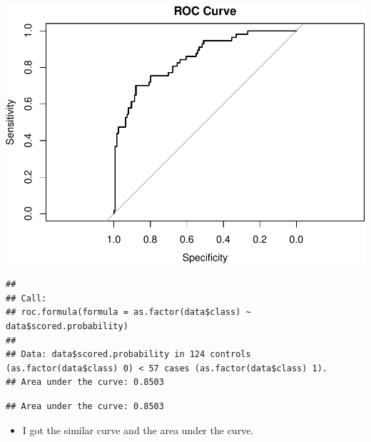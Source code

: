 \documentclass[]{article}
\newenvironment{Shaded}{\begin{snugshade}}{\end{snugshade}}
\newcommand{\KeywordTok}[1]{\textcolor[rgb]{0.13,0.29,0.53}{\textbf{{#1}}}}
\newcommand{\DataTypeTok}[1]{\textcolor[rgb]{0.13,0.29,0.53}{{#1}}}
\newcommand{\StringTok}[1]{\textcolor[rgb]{0.31,0.60,0.02}{{#1}}}
\newcommand{\NormalTok}[1]{{#1}}
\providecommand{\tightlist}{%
  \setlength{\itemsep}{0pt}\setlength{\parskip}{0pt}}
\begin{document}
\begin{Shaded}
\end{Shaded}

\includegraphics{Week2_yq_files/figure-latex/unnamed-chunk-12-1.pdf}

\begin{verbatim}
## 
## Call:
## roc.formula(formula = as.factor(data$class) ~ data$scored.probability)
## 
## Data: data$scored.probability in 124 controls (as.factor(data$class) 0) < 57 cases (as.factor(data$class) 1).
## Area under the curve: 0.8503
\end{verbatim}

\begin{Shaded}
\end{Shaded}

\begin{verbatim}
## Area under the curve: 0.8503
\end{verbatim}

\begin{itemize}
\tightlist
\item
  I got the similar curve and the area under the curve.
\end{itemize}
\end{document}
